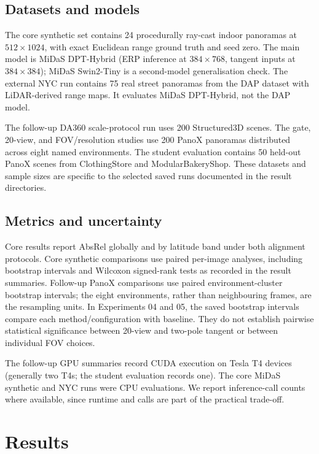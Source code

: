 \documentclass{article}
\begin{document}
\subsection{Datasets and models}

The core synthetic set contains 24 procedurally ray-cast indoor panoramas at $512\times1024$, with exact Euclidean range ground truth and seed zero. The main model is MiDaS DPT-Hybrid (ERP inference at $384\times768$, tangent inputs at $384\times384$); MiDaS Swin2-Tiny is a second-model generalisation check. The external NYC run contains 75 real street panoramas from the DAP dataset with LiDAR-derived range maps. It evaluates MiDaS DPT-Hybrid, not the DAP model.

The follow-up DA360 scale-protocol run uses 200 Structured3D scenes. The gate, 20-view, and FOV/resolution studies use 200 PanoX panoramas distributed across eight named environments. The student evaluation contains 50 held-out PanoX scenes from ClothingStore and ModularBakeryShop. These datasets and sample sizes are specific to the selected saved runs documented in the result directories.

\subsection{Metrics and uncertainty}

Core results report AbsRel globally and by latitude band under both alignment protocols. Core synthetic comparisons use paired per-image analyses, including bootstrap intervals and Wilcoxon signed-rank tests as recorded in the result summaries. Follow-up PanoX comparisons use paired environment-cluster bootstrap intervals; the eight environments, rather than neighbouring frames, are the resampling units. In Experiments 04 and 05, the saved bootstrap intervals compare each method/configuration with baseline. They do not establish pairwise statistical significance between 20-view and two-pole tangent or between individual FOV choices.

The follow-up GPU summaries record CUDA execution on Tesla T4 devices (generally two T4s; the student evaluation records one). The core MiDaS synthetic and NYC runs were CPU evaluations. We report inference-call counts where available, since runtime and calls are part of the practical trade-off.

\section{Results}
\end{document}
